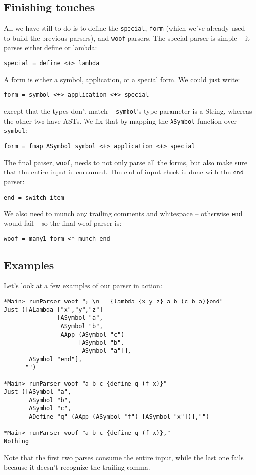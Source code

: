 \documentclass{tmr}
\begin{document}
\subsection{Finishing touches}
All we have still to do is to define the \verb+special+, \verb+form+ (which 
we've already used to build the previous parsers), and \verb+woof+ parsers.  
The special parser is simple -- it parses either define or lambda:
\begin{verbatim}
special = define <+> lambda
\end{verbatim}

A form is either a symbol, application, or a special form.  We could just write:
\begin{verbatim}
form = symbol <+> application <+> special
\end{verbatim}

except that the types don't match -- \verb+symbol+'s type parameter is a String, 
whereas the other two have ASTs.  We fix that by mapping the \verb+ASymbol+ 
function over \verb+symbol+:
\begin{verbatim}
form = fmap ASymbol symbol <+> application <+> special
\end{verbatim}

The final parser, \verb+woof+, needs to not only parse all the forms, but also 
make sure that the entire input is consumed.  The end of input check is done 
with the \verb+end+ parser:
\begin{verbatim}
end = switch item
\end{verbatim}

We also need to munch any trailing comments and whitespace -- otherwise \verb+end+
would fail -- so the final woof parser is:
\begin{verbatim}
woof = many1 form <* munch end
\end{verbatim}

\subsection{Examples}
Let's look at a few examples of our parser in action:
\begin{verbatim}
*Main> runParser woof "; \n   {lambda {x y z} a b (c b a)}end"
Just ([ALambda ["x","y","z"] 
               [ASymbol "a",
                ASymbol "b",
                AApp (ASymbol "c") 
                     [ASymbol "b",
                      ASymbol "a"]],
       ASymbol "end"],
      "")

*Main> runParser woof "a b c {define q (f x)}"
Just ([ASymbol "a",
       ASymbol "b",
       ASymbol "c",
       ADefine "q" (AApp (ASymbol "f") [ASymbol "x"])],"")

*Main> runParser woof "a b c {define q (f x)},"
Nothing
\end{verbatim}
Note that the first two parses consume the entire input, while the last one 
fails because it doesn't recognize the trailing comma.
\end{document}
